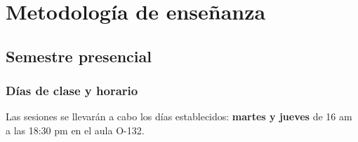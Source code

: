 \documentclass[12pt]{beamer}
\begin{document}
\section{Metodología de enseñanza}
\subsection{Semestre presencial}

\begin{frame}
\frametitle{Días de clase y horario}
Las sesiones se llevarán a cabo los días establecidos: \textbf{martes y jueves} de 16 am a las 18:30 pm en el aula O-132.
\end{frame}

\end{document}
